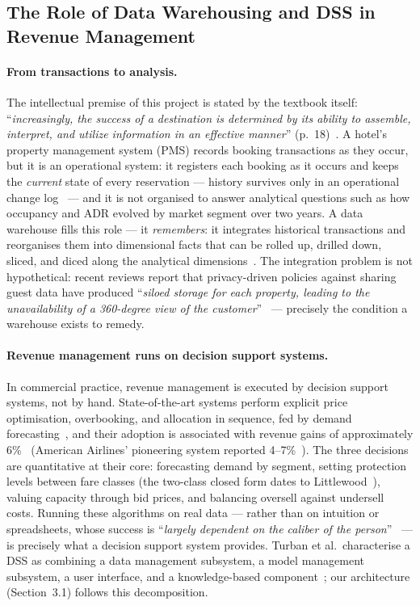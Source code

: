 \subsection{The Role of Data Warehousing and DSS in Revenue Management}

\paragraph{From transactions to analysis.}
The intellectual premise of this project is stated by the textbook itself: ``\emph{increasingly, the success of a destination is determined by its ability to assemble, interpret, and utilize information in an effective manner}'' (p.~18)~\cite{goeldner2009}. A hotel's property management system (PMS) records booking transactions as they occur, but it is an operational system: it registers each booking as it occurs and keeps the \emph{current} state of every reservation --- history survives only in an operational change log~\cite{antonio2019} --- and it is not organised to answer analytical questions such as how occupancy and ADR evolved by market segment over two years. A data warehouse fills this role --- it \emph{remembers}: it integrates historical transactions and reorganises them into dimensional facts that can be rolled up, drilled down, sliced, and diced along the analytical dimensions~\cite{kimball2013}.
The integration problem is not hypothetical: recent reviews report that privacy-driven policies against sharing guest data have produced ``\emph{siloed storage for each property, leading to the unavailability of a 360-degree view of the customer}''~\cite{jawabreh2026} --- precisely the condition a warehouse exists to remedy.

\paragraph{Revenue management runs on decision support systems.}
In commercial practice, revenue management is executed by decision support systems, not by hand. State-of-the-art systems perform explicit price optimisation, overbooking, and allocation in sequence, fed by demand forecasting~\cite{pimentel2019}, and their adoption is associated with revenue gains of approximately 6\%~\cite{boyd2003} (American Airlines' pioneering system reported 4--7\%~\cite{smith1992}). The three decisions are quantitative at their core: forecasting demand by segment, setting protection levels between fare classes (the two-class closed form dates to Littlewood~\cite{littlewood2005}), valuing capacity through bid prices, and balancing oversell against undersell costs. Running these algorithms on real data --- rather than on intuition or spreadsheets, whose success is ``\emph{largely dependent on the caliber of the person}''~\cite{anderson2012} --- is precisely what a decision support system provides. Turban et al.~characterise a DSS as combining a data management subsystem, a model management subsystem, a user interface, and a knowledge-based component~\cite{turban2011}; our architecture (Section~3.1) follows this decomposition.

